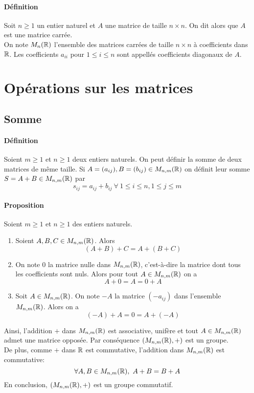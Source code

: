 \paragraph{Définition} Soit $n \geq 1$ un entier naturel et $A$ une matrice de taille $n\times n$. On dit alors que $A$ est une matrice carrée. \\ 
On note $M_{n}(\mathbb{R})$ l'ensemble des matrices carrées de taille $n\times n$ à coefficients dans $\mathbb{R}$. Les coefficients $a_{ii}$ pour $1 \leq i \leq n$ sont appellés coefficients diagonaux de $A$.

%
%
\section{Opérations sur les matrices}
%
%

%
\subsection{Somme}
%
\paragraph{Définition} Soient $m\geq 1$ et $n \geq 1$ deux entiers naturels. On peut définir la somme de deux matrices de même taille. Si $A = (a_{ij}), B = (b_{ij}) \in M_{n, m}(\mathbb{R})$ on définit leur somme $S = A + B \in M_{n, m}(\mathbb{R})$ par
$$s_{ij} = a_{ij} + b_{ij} ~ \forall ~ 1 \leq i \leq n, 1 \leq j \leq m$$

\paragraph{Proposition} Soient $m \geq 1$ et $n\geq 1$ des entiers naturels.
\begin{enumerate}
  \item Soient $A, B, C \in M_{n, m}(\mathbb{R})$. Alors
    $$(A + B) + C = A + (B + C)$$
  \item On note $0$ la matrice nulle dans $M_{n, m}(\mathbb{R})$, c'est-à-dire la matrice dont tous les coefficients sont nuls. Alors pour tout $A \in M_{n, m}(\mathbb{R})$ on a
    $$A + 0 = A = 0 + A$$
  \item Soit $A \in M_{n, m}(\mathbb{R})$. On note $-A$ la matrice $(-a_{ij})$ dans l'ensemble $M_{n, m}(\mathbb{R})$. Alors on a
    $$(-A) + A = 0 = A + (-A)$$
\end{enumerate}
Ainsi, l'addition $+$ dans $M_{n, m}(\mathbb{R})$ est associative, unifère et tout $A \in M_{n, m}(\mathbb{R})$ admet une matrice opposée. Par conséquence $(M_{n, m}(\mathbb{R}), +)$ est un groupe.\\
De plus, comme $+$ dans $\mathbb{R}$ est commutative, l'addition dans $M_{n,m}(\mathbb{R})$ est commutative:
$$\forall A, B \in M_{n, m}(\mathbb{R}), ~ A + B = B + A$$
En conclusion, $(M_{n, m}(\mathbb{R}), +)$ est un groupe commutatif.

